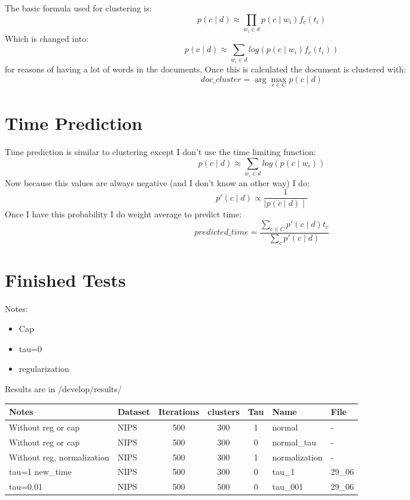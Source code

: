 \documentclass[11pt,a4paper]{article}
\begin{document}
The basic formula used for clustering is:
\begin{equation}
	p(c \mid d) \approx \prod_{w_i \in d}{p(c \mid w_i) f_c(t_i)}
\end{equation}
Which is changed into:
\begin{equation}
	p(c \mid d) \approx \sum_{w_i \in d}{log(p(c \mid w_i) f_c(t_i))}
\end{equation}
for reasons of having a lot of words in the documents. Once this is calculated the document is clustered with:
\begin{equation}
	doc\_cluster = \arg\max_{c \in C} p(c \mid d)
\end{equation}

\section{Time Prediction}
Time prediction is similar to clustering except I don't use the time limiting function:
\begin{equation}
	p(c \mid d) \approx \sum_{w_i \in d}{log(p(c \mid w_i))}
\end{equation}
Now because this values are always negative (and I don't know an other way) I do:
\begin{equation}
	p'(c \mid d) \propto \frac{1}{\mid p(c \mid d) \mid}
\end{equation}
Once I have this probability I do weight average to predict time:
\begin{equation}
	predicted\_time = \frac{\sum_{c \in C}{p'(c \mid d)t_c}}{\sum_c{p'(c \mid d)}}
\end{equation}

\section{Finished Tests}
Notes:
\begin{itemize}
  \item Cap
  \item tau=0
  \item regularization
\end{itemize}
Results are in /develop/results/

\begin{table}[h!]
	\begin{tabular}{|l|l|c|c|c|l|l|} 
      		\rowcolor[gray]{0.7}
		\hline
    Notes & Dataset & Iterations & clusters & Tau & Name & File \\ \hline
    Without reg or cap & NIPS & 500 & 300 & 1 & normal & - \\ \hline
    Without reg or cap & NIPS & 500 & 300 & 0 & normal\_tau & - \\ \hline
    Without reg, normalization & NIPS & 500 & 300 & 1 & normalization & - \\ \hline
    tau=1 new\_time & NIPS & 500 & 300 & 0 & tau\_1 & 29\_06\\ \hline
    tau=0.01 & NIPS & 500 & 500 & 0 & tau\_001 & 29\_06 \\ \hline

	\end{tabular}
\end{table}
\end{document}
